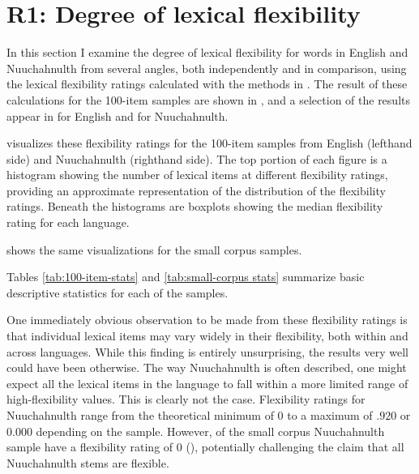 \section{R1: Degree of lexical flexibility}
\label{sec:4.3}

In this section I examine the degree of lexical flexibility for words in English and Nuuchahnulth from several angles, both independently and in comparison, using the lexical flexibility ratings calculated with the methods in . The result of these calculations for the 100-item samples are shown in , and a selection of the results appear in  for English and  for Nuuchahnulth.



 visualizes these flexibility ratings for the 100-item samples from English (lefthand side) and Nuuchahnulth (righthand side). The top portion of each figure is a histogram showing the number of lexical items at different flexibility ratings, providing an approximate representation of the distribution of the flexibility ratings. Beneath the histograms are boxplots showing the median flexibility rating for each language.


\noindent {} shows the same visualizations for the small corpus samples.


\noindent Tables \ref{tab:100-item-stats} and \ref{tab:small-corpus stats} summarize basic descriptive statistics for each of the samples.


One immediately obvious observation to be made from these flexibility ratings is that individual lexical items may vary widely in their flexibility, both within and across languages. While this finding is entirely unsurprising, the results very well could have been otherwise. The way Nuuchahnulth is often described, one might expect all the lexical items in the language to fall within a more limited range of high-flexibility values. This is clearly not the case. Flexibility ratings for Nuuchahnulth range from the theoretical minimum of $0$ to a maximum of $.920$ or $0.000$ depending on the sample. However,  of the small corpus Nuuchahnulth sample have a flexibility rating of $0$ (), potentially challenging the claim that all Nuuchahnulth stems are flexible.

